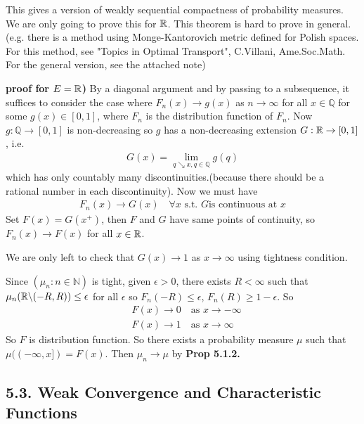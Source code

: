 \documentclass[12pt,a4paper]{report}
\newenvironment{proof}
{\begin{changemargin}{1cm}{0.5cm} 
	}%
	{\end{changemargin}
}
\begin{document}
This gives a version of weakly sequential compactness of probability measures. We are only going to prove this for $\mathbb{R}$. This theorem is hard to prove in general.(e.g. there is a method using Monge-Kantorovich metric defined for Polish spaces. For this method, see "Topics in Optimal Transport", C.Villani, Ame.Soc.Math. For the general version, see the attached note)
\begin{proof}
\textbf{proof for $E=\mathbb{R}$) } By a diagonal argument and by passing to a subsequence, it suffices to consider the case where $F_n(x) \rightarrow g(x)$ as $n\rightarrow \infty$ for all $x\in \mathbb{Q}$ for some $g(x) \in [0,1]$, where $F_n$ is the distribution function of $F_n$. Now $g: \mathbb{Q} \rightarrow [0,1]$ is non-decreasing so $g$ has a non-decreasing extension $G : \mathbb{R} \rightarrow [0,1]$, i.e.
\begin{align*}
G(x) = \lim_{q\searrow x , q\in \mathbb{Q}} g(q)
\end{align*}
which has only countably many discontinuities.(because there should be a rational number in each discontinuity). Now we must have
\begin{align*}
F_n(x) \rightarrow G(x) \quad \forall x \text{ s.t. }G \text{is continuous at }x
\end{align*}
Set $F(x) = G(x^+)$, then $F$ and $G$ have same points of continuity, so $F_n(x) \rightarrow F(x)$ for all $x\in \mathbb{R}$. 

\quad We are only left to check that $G(x) \rightarrow 1$ as $x\rightarrow \infty$ using tightness condition.

\quad Since $(\mu_n : n\in \mathbb{N})$ is tight, given $\epsilon >0$, there exists $R < \infty$ such that $\mu_n (\mathbb{R} \backslash(-R,R)) \leq\epsilon$ for all $\epsilon$ so $F_n(-R) \leq \epsilon$, $F_n(R) \geq 1-\epsilon$. So
\begin{align*}
& F(x) \rightarrow 0 \quad \text{as } x\rightarrow -\infty \\
& F(x) \rightarrow 1 \quad \text{as } x\rightarrow \infty 
\end{align*}
So $F$ is distribution function. So there exists a probability measure $\mu$ such that $\mu((-\infty,x]) = F(x)$. Then $\mu_n \rightarrow \mu$ by \textbf{Prop 5.1.2.}

\eop
\end{proof}
\s

\subsection*{5.3. Weak Convergence and Characteristic Functions}
\end{document}

